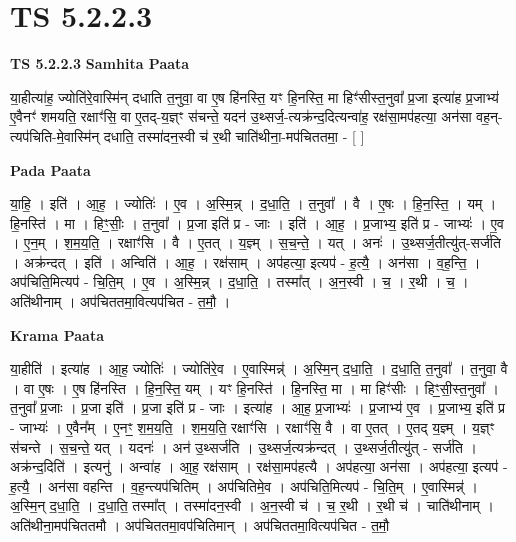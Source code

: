 \documentclass[17pt]{extarticle}
\begin{document}
\section{ TS 5.2.2.3 }

\textbf{TS 5.2.2.3 } \newline
\textbf{Samhita Paata} \newline

या॒हीत्या॑ह॒ ज्योति॑रे॒वास्मि॑न् दधाति त॒नुवा॒ वा ए॒ष हि॑नस्ति॒ यꣳ हि॒नस्ति॒ मा हिꣳ॑सीस्त॒नुवा᳚ प्र॒जा इत्या॑ह प्र॒जाभ्य॑ ए॒वैनꣳ॑ शमयति॒ रक्षाꣳ॑सि॒ वा ए॒तद्-य॒ज्ञ्ꣳ स॑चन्ते॒ यदन॑ उ॒थ्सर्ज॒-त्यक्र॑न्द॒दित्यन्वा॑ह॒ रक्ष॑सा॒मप॑हत्या॒ अन॑सा वह॒न्-त्यप॑चिति-मे॒वास्मि॑न् दधाति॒ तस्मा॑दन॒स्वी च॑ र॒थी चाति॑थीना॒-मप॑चिततमा॒ - [  ] \newline

\textbf{Pada Paata} \newline

या॒हि॒ । इति॑ । आ॒ह॒ । ज्योतिः॑ । ए॒व । अ॒स्मि॒न्न् । द॒धा॒ति॒ । त॒नुवा᳚ । वै । ए॒षः । हि॒न॒स्ति॒ । यम् । हि॒नस्ति॑ । मा । हिꣳ॒॒सीः॒ । त॒नुवा᳚ । प्र॒जा इति॑ प्र - जाः । इति॑ । आ॒ह॒ । प्र॒जाभ्य॒ इति॑ प्र - जाभ्यः॑ । ए॒व । ए॒न॒म् । श॒म॒य॒ति॒ । रक्षाꣳ॑सि । वै । ए॒तत् । य॒ज्ञ्म् । स॒च॒न्ते॒ । यत् । अनः॑ । उ॒थ्सर्ज॒तीत्यु॑त्-सर्ज॑ति । अक्र॑न्दत् । इति॑ । अन्विति॑ । आ॒ह॒ । रक्ष॑साम् । अप॑हत्या॒ इत्यप॑ - ह॒त्यै॒ । अन॑सा । व॒ह॒न्ति॒ । अप॑चिति॒मित्यप॑ - चि॒ति॒म् । ए॒व । अ॒स्मि॒न्न् । द॒धा॒ति॒ । तस्मा᳚त् । अ॒न॒स्वी । च॒ । र॒थी । च॒ । अति॑थीनाम् । अप॑चिततमा॒वित्यप॑चित - त॒मौ॒ ।  \newline


\textbf{Krama Paata} \newline

या॒हीति॑ । इत्या॑ह । आ॒ह॒ ज्योतिः॑ । ज्योति॑रे॒व । ए॒वास्मिन्न्॑ । अ॒स्मि॒न् द॒धा॒ति॒ । द॒धा॒ति॒ त॒नुवा᳚ । त॒नुवा॒ वै । वा ए॒षः । ए॒ष हि॑नस्ति । हि॒न॒स्ति॒ यम् । यꣳ हि॒नस्ति॑ । हि॒नस्ति॒ मा । मा हिꣳ॑सीः । हिꣳ॒॒सी॒स्त॒नुवा᳚ । त॒नुवा᳚ प्र॒जाः । प्र॒जा इति॑ । प्र॒जा इति॑ प्र - जाः । इत्या॑ह । आ॒ह॒ प्र॒जाभ्यः॑ । प्र॒जाभ्य॑ ए॒व । प्र॒जाभ्य॒ इति॑ प्र - जाभ्यः॑ । ए॒वैन᳚म् । ए॒नꣳ॒॒ श॒म॒य॒ति॒ । श॒म॒य॒ति॒ रक्षाꣳ॑सि । रक्षाꣳ॑सि॒ वै । वा ए॒तत् । ए॒तद् य॒ज्ञ्म् । य॒ज्ञ्ꣳ स॑चन्ते । स॒च॒न्ते॒ यत् । यदनः॑ । अन॑ उ॒थ्सर्ज॑ति । उ॒थ्सर्ज॒त्यक्र॑न्दत् । उ॒थ्सर्ज॒तीत्यु॑त् - सर्ज॑ति । अक्र॑न्द॒दिति॑ । इत्यनु॑ । अन्वा॑ह । आ॒ह॒ रक्ष॑साम् । रक्ष॑सा॒मप॑हत्यै । अप॑हत्या॒ अन॑सा । अप॑हत्या॒ इत्यप॑ - ह॒त्यै॒ । अन॑सा वहन्ति । व॒ह॒न्त्यप॑चितिम् । अप॑चितिमे॒व । अप॑चिति॒मित्यप॑ - चि॒ति॒म् । ए॒वास्मिन्न्॑ । अ॒स्मि॒न् द॒धा॒ति॒ । द॒धा॒ति॒ तस्मा᳚त् । तस्मा॑दन॒स्वी । अ॒न॒स्वी च॑ । च॒ र॒थी । र॒थी च॑ । चाति॑थीनाम् । अति॑थीना॒मप॑चिततमौ । अप॑चिततमा॒वप॑चितिमान् । अप॑चिततमा॒वित्यप॑चित - त॒मौ॒ \newline
\end{document}
